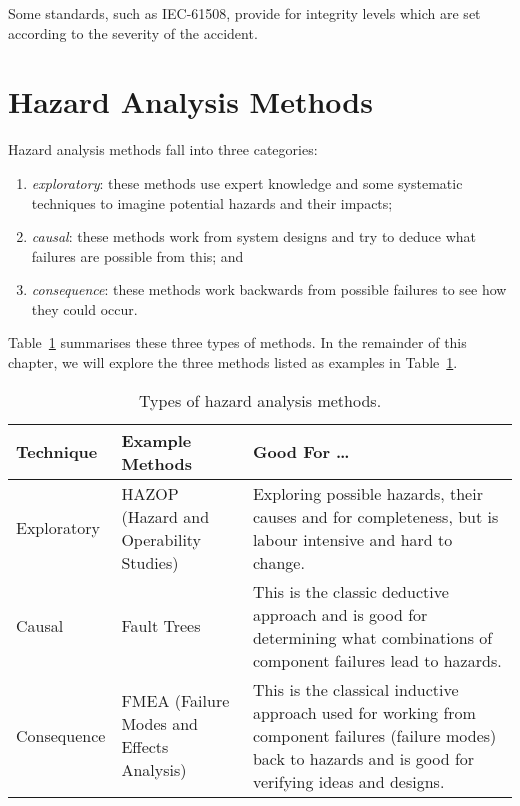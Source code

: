   Some standards, such as IEC-61508, provide for integrity levels which
  are set according to the severity of the accident.


  \section{Hazard Analysis Methods}

Hazard analysis methods fall into three categories: 

\begin{enumerate}

 \item \emph{exploratory}: these methods use expert knowledge and some systematic techniques to imagine potential hazards and their impacts;

 \item \emph{causal}: these methods work from system designs and try to deduce what failures are possible from this;  and
 
 \item \emph{consequence}: these methods work backwards from possible failures to see how they could occur.

\end{enumerate}

Table~\ref{tab:safety:hazard-analysis-methods} summarises these three types of methods. In the remainder of this chapter, we will explore the three methods listed as examples in Table~\ref{tab:safety:hazard-analysis-methods}.

\begin{table}[!h]
\centering
\begin{tabular}{lp{5cm}p{7cm}}
\toprule
{\bf Technique} & {\bf Example Methods} & {\bf Good For \ldots}\\
\midrule
Exploratory & HAZOP (Hazard and Operability Studies) & Exploring
possible hazards, their causes and for completeness, but is 
labour intensive and hard to change. \\[2mm]
Causal & Fault Trees & This is the classic deductive approach and is
good for determining what combinations of component failures lead to
hazards.\\[2mm]
Consequence & FMEA (Failure Modes and Effects Analysis) & This is the
classical inductive approach used for working from component failures
(failure modes) back to hazards and is good for verifying ideas and
designs.\\
\bottomrule
\end{tabular}
\caption{Types of hazard analysis methods.}
\label{tab:safety:hazard-analysis-methods}
\end{table}


